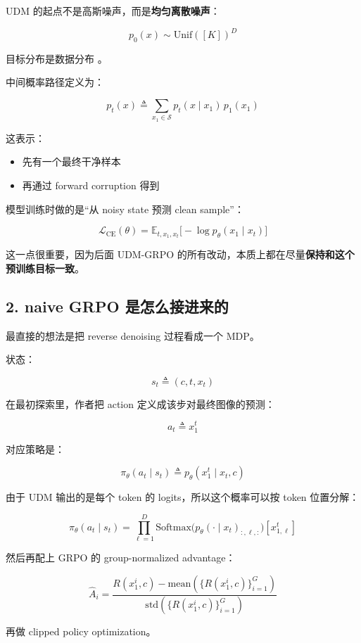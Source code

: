UDM 的起点不是高斯噪声，而是\textbf{均匀离散噪声}：

\[
p_0(x) \sim \mathrm{Unif}([K])^D
\]

目标分布是数据分布 。

中间概率路径定义为：

\[
p_t(x) \triangleq \sum_{x_1 \in \mathcal{S}} p_t(x \mid x_1)\, p_1(x_1)
\]

这表示：

\begin{itemize}[leftmargin=1.5em]
  \item 先有一个最终干净样本 
  \item 再通过 forward corruption 得到 
\end{itemize}

模型训练时做的是“从 noisy state 预测 clean sample”：

\[
\mathcal{L}_{\mathrm{CE}}(\theta)
=
\mathbb{E}_{t, x_1, x_t}\big[-\log p_\theta(x_1 \mid x_t)\big]
\]

这一点很重要，因为后面 UDM-GRPO 的所有改动，本质上都在尽量\textbf{保持和这个预训练目标一致}。

\subsection{2. naive GRPO 是怎么接进来的}

最直接的想法是把 reverse denoising 过程看成一个 MDP。

状态：

\[
s_t \triangleq (c, t, x_t)
\]

在最初探索里，作者把 action 定义成该步对最终图像的预测：

\[
a_t \triangleq x_1^t
\]

对应策略是：

\[
\pi_\theta(a_t \mid s_t)
\triangleq
p_\theta(x_1^t \mid x_t, c)
\]

由于 UDM 输出的是每个 token 的 logits，所以这个概率可以按 token 位置分解：

\[
\pi_\theta(a_t \mid s_t)
=
\prod_{\ell=1}^{D}
\mathrm{Softmax}\!\big(p_\theta(\cdot \mid x_t)_{:,\ell,:}\big)[x_{1,\ell}^{t}]
\]

然后再配上 GRPO 的 group-normalized advantage：

\[
\hat{A}_i
=
\frac{R(x_1^i, c) - \mathrm{mean}(\{R(x_1^i, c)\}_{i=1}^{G})}
{\mathrm{std}(\{R(x_1^i, c)\}_{i=1}^{G})}
\]

再做 clipped policy optimization。

